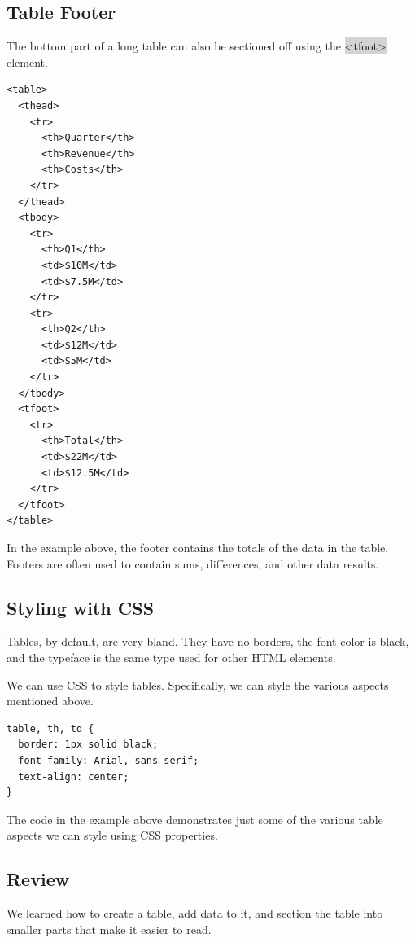 \documentclass[11pt]{article}
\begin{document}
\subsection{Table Footer}
The bottom part of a long table can also be sectioned off using the \colorbox{lightgray}{<tfoot>} element.
\begin{lstlisting}
<table>
  <thead>
    <tr>
      <th>Quarter</th>
      <th>Revenue</th>
      <th>Costs</th>
    </tr>
  </thead>
  <tbody>
    <tr>
      <th>Q1</th>
      <td>$10M</td>
      <td>$7.5M</td>
    </tr>
    <tr>
      <th>Q2</th>
      <td>$12M</td>
      <td>$5M</td>
    </tr>
  </tbody>
  <tfoot>
    <tr>
      <th>Total</th>
      <td>$22M</td>
      <td>$12.5M</td>
    </tr>
  </tfoot>
</table>
\end{lstlisting}
In the example above, the footer contains the totals of the data in the table. Footers are often used to contain sums, differences, and other data results.

\subsection{Styling with CSS}
Tables, by default, are very bland. They have no borders, the font color is black, and the typeface is the same type used for other HTML elements.

We can use CSS to style tables. Specifically, we can style the various aspects mentioned above.
\begin{lstlisting}
table, th, td {
  border: 1px solid black;
  font-family: Arial, sans-serif;
  text-align: center;
}
\end{lstlisting}
The code in the example above demonstrates just some of the various table aspects we can style using CSS properties.

\subsection{Review}
We learned how to create a table, add data to it, and section the table into smaller parts that make it easier to read.
\end{document}
